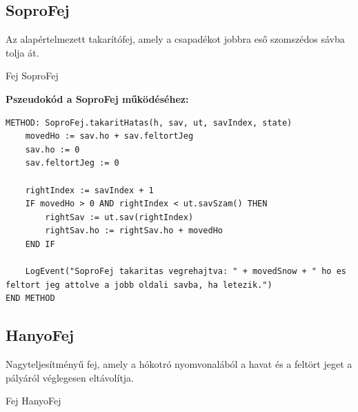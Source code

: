 \subsection{SoproFej}
\begin{class-template-responsibility}
    Az alapértelmezett takarítófej, amely a csapadékot jobbra eső szomszédos sávba tolja át.
\end{class-template-responsibility}
\begin{class-template-baseclass}
    Fej \baseclass SoproFej
\end{class-template-baseclass}
\begin{class-template-attribute}
\end{class-template-attribute}
\begin{class-template-method}
\end{class-template-method}
\textbf{Pszeudokód a SoproFej működéséhez:}
\begin{verbatim}
METHOD: SoproFej.takaritHatas(h, sav, ut, savIndex, state)
    movedHo := sav.ho + sav.feltortJeg
    sav.ho := 0
    sav.feltortJeg := 0
    
    rightIndex := savIndex + 1
    IF movedHo > 0 AND rightIndex < ut.savSzam() THEN
        rightSav := ut.sav(rightIndex)
        rightSav.ho := rightSav.ho + movedHo
    END IF

    LogEvent("SoproFej takaritas vegrehajtva: " + movedSnow + " ho es feltort jeg attolve a jobb oldali savba, ha letezik.")
END METHOD
\end{verbatim}

\subsection{HanyoFej}
\begin{class-template-responsibility}
    Nagyteljesítményű fej, amely a hókotró nyomvonalából a havat és a feltört jeget a pályáról véglegesen eltávolítja. 
\end{class-template-responsibility}
\begin{class-template-baseclass}
    Fej \baseclass HanyoFej
\end{class-template-baseclass}
\begin{class-template-attribute}
\end{class-template-attribute}
\begin{class-template-method}
\end{class-template-method}

